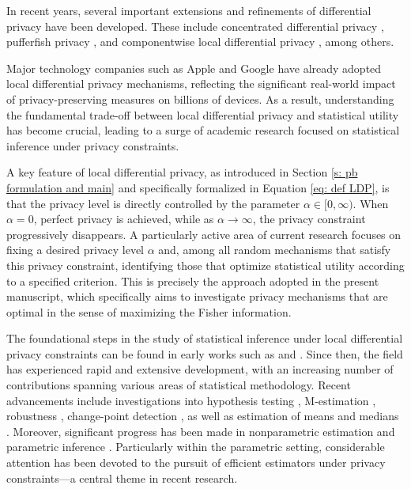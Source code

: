 \documentclass[a4paper, 11pt]{article}
\theoremstyle{definition}
\begin{document}
{In recent years, several important extensions and refinements of differential privacy have been developed. These include concentrated differential privacy \cite{BunSte16, DwoRot16}, pufferfish privacy \cite{puff}, and componentwise local differential privacy \cite{AmoGlo23}, among others.



Major technology companies such as Apple \cite{5LDP, 49LDP} and Google \cite{1LDP, 23LDP} have already adopted local differential privacy mechanisms, reflecting the significant real-world impact of privacy-preserving measures on billions of devices. As a result, understanding the fundamental trade-off between local differential privacy and statistical utility has become crucial, leading to a surge of academic research focused on statistical inference under privacy constraints.

A key feature of local differential privacy, as introduced in Section \ref{s: pb formulation and main} and specifically formalized in Equation \eqref{eq: def LDP}, is that the privacy level is directly controlled by the parameter $\alpha \in [0, \infty)$. When $\alpha = 0$, perfect privacy is achieved, while as $\alpha \to \infty$, the privacy constraint progressively disappears. A particularly active area of current research focuses on fixing a desired privacy level $\alpha$ and, among all random mechanisms that satisfy this privacy constraint, identifying those that optimize statistical utility according to a specified criterion. This is precisely the approach adopted in the present manuscript, which specifically aims to investigate privacy mechanisms that are optimal in the sense of maximizing the Fisher information.



The foundational steps in the study of statistical inference under local differential privacy constraints can be found in early works such as \cite{Martin} and \cite{WassermanZhou10}. Since then, the field has experienced rapid and extensive development, with an increasing number of contributions spanning various areas of statistical methodology. Recent advancements include investigations into hypothesis testing \cite{4CLDP, 29CLDP}, M-estimation \cite{Avella}, robustness \cite{31CLDP}, change-point detection \cite{6CLDP}, as well as estimation of means and medians \cite{Martin}. Moreover, significant progress has been made in nonparametric estimation \cite{10CLDP, 11CLDP, Kro24} and parametric inference \cite{AmoGloHal, Asi22, DucRog19, Jos19, KalSte}. Particularly within the parametric setting, considerable attention has been devoted to the pursuit of efficient estimators under privacy constraints—a central theme in recent research.

}
\end{document}
